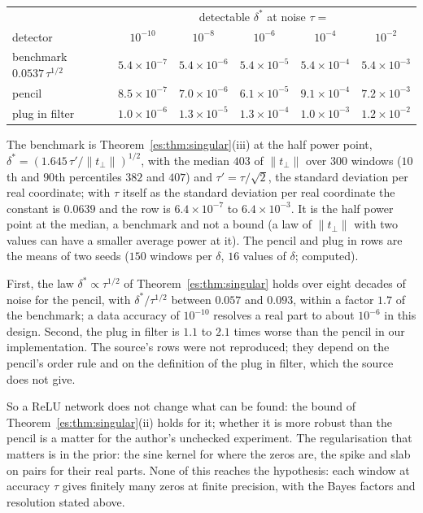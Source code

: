 \begin{center}
\footnotesize
\setlength{\tabcolsep}{3pt}
\begin{tabular}{lccccc}
\toprule
& \multicolumn{5}{c}{detectable $\delta^*$ at noise $\tau=$}\\
detector & $10^{-10}$ & $10^{-8}$ & $10^{-6}$ & $10^{-4}$ & $10^{-2}$\\
\midrule
benchmark $0.0537\,\tau^{1/2}$ & $5.4\times10^{-7}$ & $5.4\times10^{-6}$ & $5.4\times10^{-5}$ & $5.4\times10^{-4}$ & $5.4\times10^{-3}$\\
pencil & $8.5\times10^{-7}$ & $7.0\times10^{-6}$ & $6.1\times10^{-5}$ & $9.1\times10^{-4}$ & $7.2\times10^{-3}$\\
plug in filter & $1.0\times10^{-6}$ & $1.3\times10^{-5}$ & $1.3\times10^{-4}$ & $1.0\times10^{-3}$ & $1.2\times10^{-2}$\\
\bottomrule
\end{tabular}
\end{center}

\noindent The benchmark is Theorem~\ref{es:thm:singular}(iii) at the half power point, $\delta^*=(1.645\,\tau'/\|t_\perp\|)^{1/2}$, with the median $403$ of $\|t_\perp\|$ over $300$ windows ($10$th and $90$th percentiles $382$ and $407$) and $\tau'=\tau/\sqrt2$, the standard deviation per real coordinate; with $\tau$ itself as the standard deviation per real coordinate the constant is $0.0639$ and the row is $6.4\times10^{-7}$ to $6.4\times10^{-3}$. It is the half power point at the median, a benchmark and not a bound (a law of $\|t_\perp\|$ with two values can have a smaller average power at it). The pencil and plug in rows are the means of two seeds ($150$ windows per $\delta$, $16$ values of $\delta$; computed).

First, the law $\delta^*\propto\tau^{1/2}$ of Theorem~\ref{es:thm:singular} holds over eight decades of noise for the pencil, with $\delta^*/\tau^{1/2}$ between $0.057$ and $0.093$, within a factor $1.7$ of the benchmark; a data accuracy of $10^{-10}$ resolves a real part to about $10^{-6}$ in this design. Second, the plug in filter is $1.1$ to $2.1$ times worse than the pencil in our implementation. The source's rows were not reproduced; they depend on the pencil's order rule and on the definition of the plug in filter, which the source does not give.

So a ReLU network does not change what can be found: the bound of Theorem~\ref{es:thm:singular}(ii) holds for it; whether it is more robust than the pencil is a matter for the author's unchecked experiment. The regularisation that matters is in the prior: the sine kernel for where the zeros are, the spike and slab on pairs for their real parts. None of this reaches the hypothesis: each window at accuracy $\tau$ gives finitely many zeros at finite precision, with the Bayes factors and resolution stated above.

